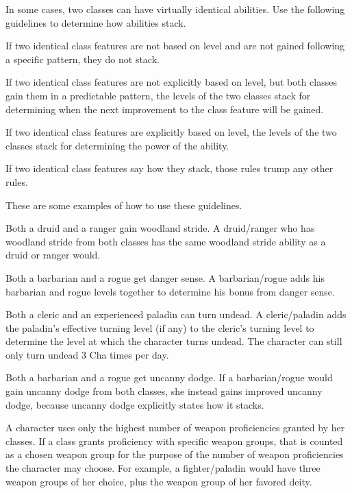 \par In some cases, two classes can have virtually identical abilities.
Use the following guidelines to determine how abilities stack.
\begin{itemize*}
\item If two identical class features are not based on level and are not gained following a specific pattern, they do not stack.
\item If two identical class features are not explicitly based on level, but both classes gain them in a predictable pattern, the levels of the two classes stack for determining when the next improvement to the class feature will be gained.
\item If two identical class features are explicitly based on level, the levels of the two classes stack for determining the power of the ability.
\item If two identical class features say how they stack, those rules trump any other rules.
\end{itemize*}
These are some examples of how to use these guidelines.
\begin{itemize*}
\item Both a druid and a ranger gain woodland stride. A druid/ranger who has woodland stride from both classes has the same woodland stride ability as a druid or ranger would.
\item Both a barbarian and a rogue get danger sense. A barbarian/rogue adds his barbarian and rogue levels together to determine his bonus from danger sense.
\item Both a cleric and an experienced paladin can turn undead. A cleric/paladin adds the paladin's effective turning level (if any) to the cleric's turning level to determine the level at which the character turns undead. The character can still only turn undead 3 \add Cha times per day.
\item Both a barbarian and a rogue get uncanny dodge. If a barbarian/rogue would gain uncanny dodge from both classes, she instead gains improved uncanny dodge, because uncanny dodge explicitly states how it stacks.
\end{itemize*}

 A character uses only the highest number of weapon proficiencies granted by her classes. If a class grants proficiency with specific weapon groups, that is counted as a chosen weapon group for the purpose of the number of weapon proficiencies the character may choose. For example, a fighter/paladin would have three weapon groups of her choice, plus the weapon group of her favored deity.

